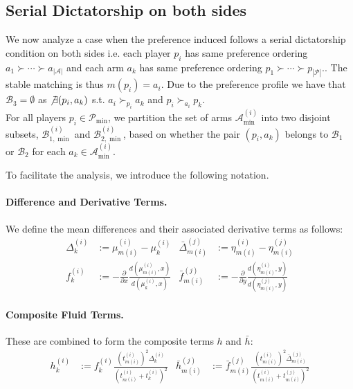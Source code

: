 \documentclass{article}
\begin{document}
\subsection{Serial Dictatorship on both sides}
 We now analyze a case when the preference induced follows a serial dictatorship condition on both sides i.e. each player $p_i$ has same preference ordering $a_1\succ \cdots \succ a_{|\mathcal{A}|}$ and each arm $a_k$ has same preference ordering $p_1\succ \cdots \succ p_{|\mathcal{P}|}. $. The stable matching is thus $m(p_i)=a_i$. Due to the preference profile we have that $\mathcal{B}_3=\emptyset$ as $\not\exists (p_i,a_k)$ s.t. $a_i\succ_{p_i}a_k$ and $p_i\succ_{a_i}p_k$.\\
For all players $p_i\in\mathcal{P}_{\min}$, we partition the set of arms $\mathcal{A}^{(i)}_{\min}$ into two disjoint subsets, $\mathcal{B}^{(i)}_{1,\min}$ and $\mathcal{B}^{(i)}_{2,\min}$, based on whether the pair $(p_i,a_k)$ belongs to $\mathcal{B}_1$ or $\mathcal{B}_2$ for each $a_k\in\mathcal{A}^{(i)}_{\min}$.

To facilitate the analysis, we introduce the following notation.

\paragraph{Difference and Derivative Terms.} We define the mean differences and their associated derivative terms as follows:
\begin{align*}
    \Delta^{(i)}_{k} &:= \mu^{(i)}_{m(i)}-\mu^{(i)}_{k} & \bar{\Delta}^{(j)}_{m(i)} &:= \eta^{(i)}_{m(i)}-\eta^{(j)}_{m(i)} \\
    f^{(i)}_k &:= -\frac{\partial}{\partial x}\frac{d(\mu^{(i)}_{m(i)} ,x)}{d(\mu^{(i)}_{k},x)} & \bar{f}^{(j)}_{m(i)} &:= -\frac{\partial}{\partial y}\frac{d(\eta^{(i)}_{m(i)},y)}{d(\eta^{(j)}_{m(i)},y)}
\end{align*}

\paragraph{Composite Fluid Terms.} These are combined to form the composite terms $h$ and $\bar{h}$:
\begin{align*}
    h^{(i)}_k &:= f^{(i)}_k \frac{(t^{(i)}_{m(i)})^2\Delta^{(i)}_{k}}{(t^{(i)}_{m(i)}+t^{(i)}_k)^2} & \bar{h}^{(j)}_{m(i)} &:= \bar{f}^{(j)}_{m(i)} \frac{(t^{(i)}_{m(i)})^2\bar{\Delta}^{(j)}_{m(i)}}{(t^{(i)}_{m(i)}+t^{(j)}_{m(i)})^2}
\end{align*}
\end{document}
